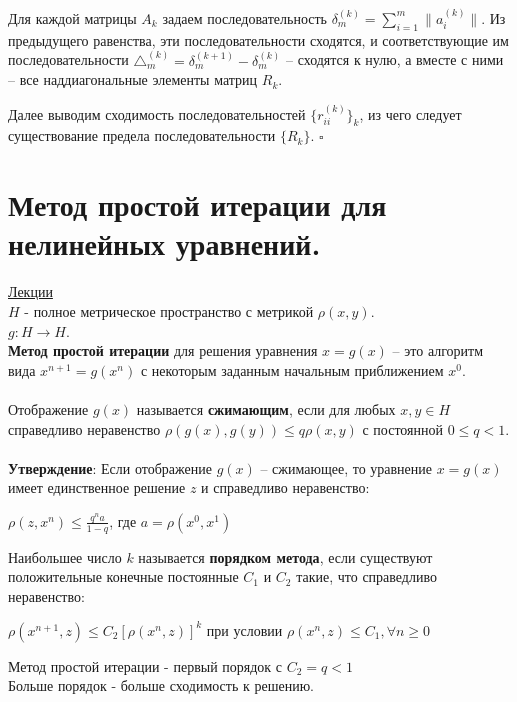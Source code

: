 \documentclass[specialist, subf, href, colorlinks=true, 12pt, times, mtpro, final]{disser}
\theoremstyle{definition}
\begin{document}
Для каждой матрицы $A_k$ задаем последовательность $\delta^{(k)}_m = \sum\limits^m_{i=1} \|a^{(k)}_i\|$. Из предыдущего равенства, эти последовательности сходятся, и соответствующие им последовательности $\triangle^{(k)}_m = \delta^{(k+1)}_m - \delta^{(k)}_m$ \--- сходятся к нулю, а вместе с ними \--- все наддиагональные элементы матриц $R_k$.

Далее выводим сходимость последовательностей $\{r^{(k)}_{ii}\}_k$, из чего следует существование предела последовательности $\{R_k\}$. $\square$



\section {Метод простой итерации для нелинейных уравнений.}
	\hyperlink {lects.82}{Лекции}\\
	
$H$	 - полное метрическое пространство с метрикой $\rho(x,y)$.\\
$g:H \rightarrow H$.\\

\textbf{Метод простой итерации} для решения уравнения $x = g(x)$ \--- это алгоритм вида $x^{n+1} = g(x^n)$ с некоторым заданным начальным приближением $x^0$.\\
\\
Отображение $g(x)$ называется \textbf{сжимающим}, если для любых $x, y \in H$ справедливо неравенство $\rho(g(x), g(y)) \leq q\rho(x,y)$ с постоянной $0 \leq q < 1$.\\
\\
\textbf{Утверждение}: Если отображение $g(x)$ \--- сжимающее, то уравнение $x=g(x)$  имеет единственное решение $z$ и справедливо неравенство:
\begin{center}
$\rho (z, x^n) \leq \frac{q^na}{1-q}$, где $a = \rho (x^0, x^1)$
\end{center}

Наибольшее число $k$ называется \textbf{порядком метода}, если существуют положительные конечные постоянные $C_1$ и $C_2$ такие, что справедливо неравенство:
\begin{center}
$\rho(x^{n+1}, z) \leq C_2 [\rho(x^n,z)]^k$ 
при условии
 $ \rho (x^n,z) \leq C_1, \forall n \geq 0$
\end{center}

Метод простой итерации - первый порядок с $C_2 = q < 1$\\

Больше порядок - больше сходимость к решению.
	
\end{document}
